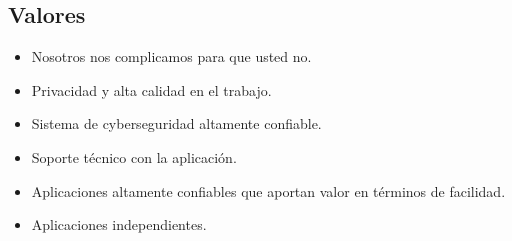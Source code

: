 \documentclass{article}
\begin{document}
\subsection{Valores}
\begin{itemize}
    \item Nosotros nos complicamos para que usted no.
    \item Privacidad y alta calidad en el trabajo.
    \item Sistema de cyberseguridad altamente confiable.
    \item Soporte técnico con la aplicación.
    \item Aplicaciones altamente confiables que aportan valor en términos de facilidad.
    \item Aplicaciones independientes.
\end{itemize}
\end{document}
